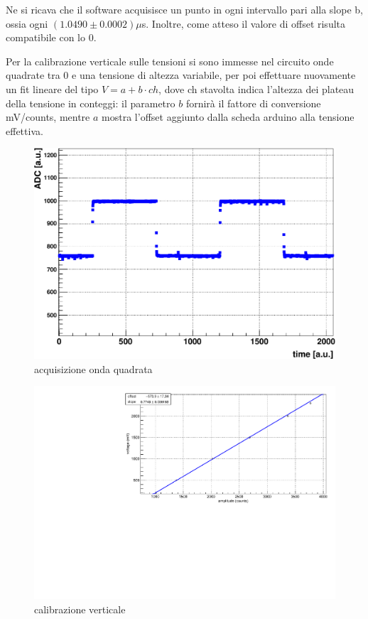 \documentclass{article}
\begin{document}
Ne si ricava che il software acquisisce un punto in ogni intervallo pari alla slope b, ossia ogni $(1.0490 \pm 0.0002)\mu $s.
Inoltre, come atteso il valore di offset risulta compatibile con lo 0.

Per la calibrazione verticale sulle tensioni si sono immesse nel circuito onde quadrate tra 0 e una tensione di altezza variabile, 
per poi effettuare nuovamente un fit lineare del tipo $V = a + b \cdot ch$, dove ch stavolta indica l'altezza dei plateau della tensione 
in conteggi: il parametro $b$ fornirà il fattore di conversione mV/counts, mentre $a$ mostra l'offset aggiunto dalla scheda arduino alla tensione effettiva.

\begin{center}
\begin{figure}[H]
\centering
\includegraphics[scale=0.4, angle=0]{4_2.pdf}
\caption{acquisizione onda quadrata}
\label{fig:voltage_counts}
\end{figure}
\end{center}

\begin{center}
\begin{figure}[H]
\centering
\includegraphics[scale=0.4, angle=0]{calibverticale.pdf}
\caption{calibrazione verticale}
\label{fig:calibverticale}
\end{figure}
\end{center}
\end{document}
